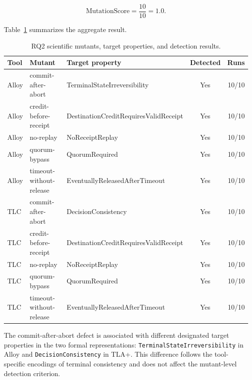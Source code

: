 \begin{equation}
\mathrm{MutationScore}
=
\frac{10}{10}
=
1.0.
\label{eq:rq2-mutation-score}
\end{equation}

Table~\ref{tab:rq2-summary} summarizes the aggregate result.

\begin{table}[htbp]
\centering
\footnotesize
\setlength{\tabcolsep}{2pt}
\caption{RQ2 scientific mutants, target properties, and detection results.}
\label{tab:rq2-summary}
\begin{tabular}{lp{}p{}cr}
\hline
Tool & Mutant & Target property & Detected & Runs \\
\hline
Alloy &
commit-after-abort &
TerminalState\allowbreak Irreversibility &
Yes & 10/10 \\

Alloy &
credit-before-receipt &
DestinationCreditRequires\allowbreak ValidReceipt &
Yes & 10/10 \\

Alloy &
no-replay &
NoReceipt\allowbreak Replay &
Yes & 10/10 \\

Alloy &
quorum-bypass &
Quorum\allowbreak Required &
Yes & 10/10 \\

Alloy &
timeout-without-release &
EventuallyReleasedAfter\allowbreak Timeout &
Yes & 10/10 \\

TLC &
commit-after-abort &
Decision\allowbreak Consistency &
Yes & 10/10 \\

TLC &
credit-before-receipt &
DestinationCreditRequires\allowbreak ValidReceipt &
Yes & 10/10 \\

TLC &
no-replay &
NoReceipt\allowbreak Replay &
Yes & 10/10 \\

TLC &
quorum-bypass &
Quorum\allowbreak Required &
Yes & 10/10 \\

TLC &
timeout-without-release &
EventuallyReleasedAfter\allowbreak Timeout &
Yes & 10/10 \\
\hline
\end{tabular}
\end{table}

The commit-after-abort defect is associated with different designated
target properties in the two formal representations:
\texttt{TerminalState\allowbreak Irreversibility} in Alloy and
\texttt{Decision\allowbreak Consistency} in TLA+. This difference follows the
tool-specific encodings of terminal consistency and does not affect
the mutant-level detection criterion.

